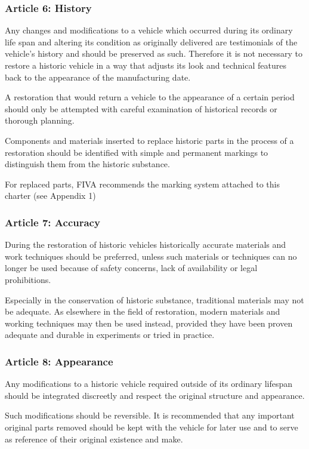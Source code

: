 \documentclass[12pt]{article}
\begin{document}
\subsubsection{Article 6: History}

Any changes and modifications to a vehicle which occurred during its ordinary life span and altering its condition as originally delivered are testimonials of the vehicle’s history and should be preserved as such. Therefore it is not necessary to restore a historic vehicle in a way that adjusts its look and technical features back to the appearance of the manufacturing date.

A restoration that would return a vehicle to the appearance of a certain period should only be attempted with careful examination of historical records  or thorough planning.

Components and materials inserted to replace historic parts in the process of a restoration should be identified with simple and permanent markings to distinguish them from the historic substance.

For replaced parts, FIVA recommends the marking system attached to this charter (see Appendix 1) 


\subsubsection{Article 7: Accuracy}

During the restoration of historic vehicles historically accurate materials and work techniques should be preferred, unless such materials or techniques can no longer be used because of safety concerns, lack of availability or legal prohibitions.

Especially in the conservation of historic substance, traditional materials may not be adequate. As elsewhere in the field of restoration, modern materials and working techniques may then be used instead, provided they have been proven adequate and durable in experiments or tried in practice.


\subsubsection{Article 8: Appearance}

Any modifications to a historic vehicle required outside of its ordinary lifespan should be integrated discreetly and respect the original structure and appearance.

Such modifications should be reversible. It is recommended that any important original parts removed should be kept with the vehicle for later use and to serve as reference of their original existence and make. 
\end{document}
